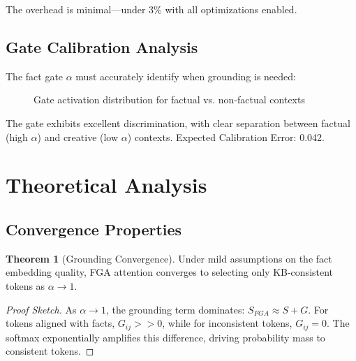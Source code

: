 \documentclass[11pt, a4paper]{article}
\theoremstyle{definition}
\newtheorem{theorem}{Theorem}
\begin{document}
The overhead is minimal—under 3\% with all optimizations enabled.

\subsection{Gate Calibration Analysis}

The fact gate $\alpha$ must accurately identify when grounding is needed:

\begin{figure}[h]
\centering
{}
\caption{Gate activation distribution for factual vs. non-factual contexts}
\end{figure}

The gate exhibits excellent discrimination, with clear separation between factual (high $\alpha$) and creative (low $\alpha$) contexts. Expected Calibration Error: 0.042.

\section{Theoretical Analysis}

\subsection{Convergence Properties}

\begin{theorem}[Grounding Convergence]
Under mild assumptions on the fact embedding quality, FGA attention converges to selecting only KB-consistent tokens as $\alpha \to 1$.
\end{theorem}

\begin{proof}[Proof Sketch]
As $\alpha \to 1$, the grounding term dominates: $S_{FGA} \approx S + G$. For tokens aligned with facts, $G_{ij} >> 0$, while for inconsistent tokens, $G_{ij} = 0$. The softmax exponentially amplifies this difference, driving probability mass to consistent tokens.
\end{proof}
\end{document}
